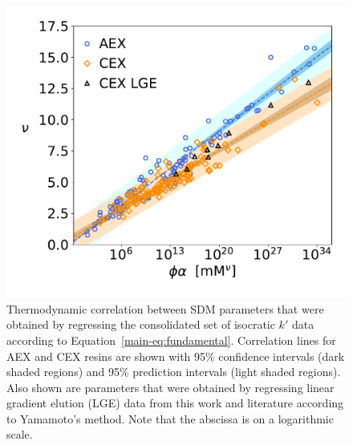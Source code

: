 \documentclass[11pt,a4paper]{article}
\providecommand{\DIFaddbeginFL}{} %
\providecommand{\DIFaddendFL}{} %
\providecommand{\DIFdelbeginFL}{} %
\providecommand{\DIFdelendFL}{} %
\begin{document}
\begin{figure}[htbp]
    \centering
    \DIFdelbeginFL %
\DIFdelendFL \DIFaddbeginFL \includegraphics[width=\textwidth]{figure_7}
    \DIFaddendFL \caption{
    Thermodynamic correlation between SDM parameters that were obtained by regressing the consolidated set of isocratic $k'$ data according to Equation~\ref{main-eq:fundamental}. Correlation lines for AEX and CEX resins are shown with 95\% confidence intervals (dark shaded regions) and 95\% prediction intervals (light shaded regions). Also shown are parameters that were obtained by regressing linear gradient elution (LGE) data from this work and literature according to Yamamoto's method. Note that the abscissa is on a logarithmic scale.
    }
    \label{fig:sdm parameter correlation}
\end{figure}
\end{document}

